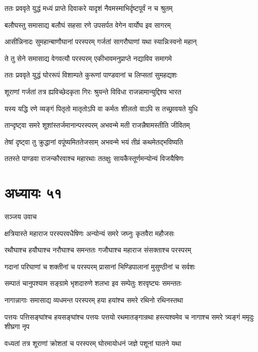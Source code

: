 \twolineshloka
{ततः प्रववृते युद्धं मध्यं प्राप्ते दिवाकरे}
{यादृशं नैवमस्माभिर्दृष्टपूर्वं न च श्रुतम्}


\twolineshloka
{बलौघस्तु समासाद्य बलौघं सहसा रणे}
{उपसर्पत वेगेन वार्योघ इव सागरम्}


\twolineshloka
{आसीन्निनादः सुमहान्बाणौघानां परस्परम्}
{गर्जतां सागरौघाणां यथा स्यान्निःस्वनो महान्}


\twolineshloka
{ते तु सेने समासाद्य वेगवत्यौ परस्परम्}
{एकीभावमनुप्राप्ते नद्याविव समागमे}


\twolineshloka
{ततः प्रववृते युद्धं घोररूपं विशाम्पते}
{कुरूणां पाण्डवानां च लिप्सतां सुमहद्यशः}


\twolineshloka
{शूराणां गर्जतां तत्र ह्यविच्छेदकृता गिरः}
{श्रुयन्ते विविधा राजन्नामान्युद्दिश्य भारत}


\twolineshloka
{यस्य यद्धि रणे व्यङ्गं पितृतो मातृतोऽपि वा}
{कर्मतः शीलतो वाऽपि स तच्छ्रावयते युधि}


\twolineshloka
{तान्दृष्ट्वा समरे शूशांस्तर्जमानान्परस्परम्}
{अभवन्मे मती राजन्नैषामस्तीति जीवितम्}


\twolineshloka
{तेषां दृष्ट्वा तु क्रुद्धानां वपूंष्यमिततेजसाम्}
{अभवन्मे भयं तीव्रं कथमेतद्भविष्यति}


\twolineshloka
{ततस्ते पाण्डवा राजन्कौरवाश्च महारथाः}
{ततक्षुः सायकैस्तूर्णमन्योन्यं विजयैषिणः}


\chapter{अध्यायः ५१}
\twolineshloka
{सञ्जय उवाच}
{}


\twolineshloka
{क्षत्रियास्ते महाराज परस्परवधैषिणः}
{अन्योन्यं समरे जघ्नुः कृतवैरा महौजसः}


\twolineshloka
{रथौघाश्च हयौघाश्च नरौघाश्च समन्ततः}
{गजौघाश्च महाराज संसक्ताश्च परस्परम्}


\twolineshloka
{गदानां परिघाणां च शक्तीनां च परस्परम्}
{प्रासानां भिण्डिपालानां मुसुण्ठीनां च सर्वशः}


\twolineshloka
{सम्पातं चानुपश्याम सङ्ग्रामे भृशदारुणे}
{शलभा इव सम्पेतुः शरवृष्ट्यः समन्ततः}


\twolineshloka
{नागान्नागाः समासाद्य व्यधमन्त परस्परम्}
{हया हयांश्च समरे रथिनो रथिनस्तथा}


\threelineshloka
{पत्तयः पत्तिसङ्घांश्च हयसङ्घांश्च पत्तयः}
{पत्तयो रथमातङ्गान्रथा हस्त्यश्वमेव च}
{नागाश्च समरे त्र्यङ्गं ममृदुः शीघ्रगा नृप}


\twolineshloka
{वध्यतां तत्र शूराणां क्रोशतां च परस्परम्}
{घोरमायोधनं जज्ञे पशूनां घातने यथा}


